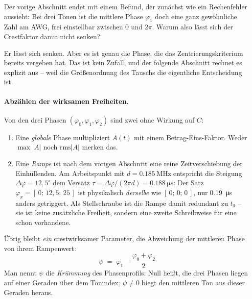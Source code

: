 \documentclass[11pt,a4paper]{article}
\newcommand{\crest}{\ensuremath{C}}
\begin{document}
Der vorige Abschnitt endet mit einem Befund, der zunächst wie ein
Rechenfehler aussieht: Bei drei Tönen ist die mittlere Phase $\varphi_1$ doch
eine ganz gewöhnliche Zahl am AWG, frei einstellbar zwischen $0$ und
$2\pi$. Warum also lässt sich der Crestfaktor damit nicht senken?

Er lässt sich senken. Aber es ist genau die Phase, die das
Zentrierungskriterium bereits vergeben hat. Das ist kein Zufall, und der
folgende Abschnitt rechnet es explizit aus -- weil die Größenordnung des
Tauschs die eigentliche Entscheidung ist.

\paragraph{Abzählen der wirksamen Freiheiten.}
Von den drei Phasen $(\varphi_0,\varphi_1,\varphi_2)$ sind zwei ohne Wirkung
auf $\crest$:
\begin{enumerate}
  \item Eine \emph{globale} Phase multipliziert $A(t)$ mit einem Betrag-Eins-Faktor.
        Weder $\max|A|$ noch $\mathrm{rms}|A|$ merken das.
  \item Eine \emph{Rampe} ist nach dem vorigen Abschnitt eine reine
        Zeitverschiebung der Einhüllenden. Am Arbeitspunkt mit
        $d=\SI{0.185}{\mega\hertz}$ entspricht die Steigung
        $\Delta\varphi=12{,}5^\circ$ dem Versatz
        $\tau=\Delta\varphi/(2\pi d)=\SI{0.188}{\micro\second}$: Der Satz
        $\varphi_x=[\,0;\,12{,}5;\,25\,]$ ist physikalisch \emph{derselbe}
        wie $[\,0;\,0;\,0\,]$, nur \SI{0.19}{\micro\second} anders
        getriggert. Als Stellschraube ist die Rampe damit redundant zu
        $t_0$ -- sie ist keine zusätzliche Freiheit, sondern eine zweite
        Schreibweise für eine schon vorhandene.
\end{enumerate}
Übrig bleibt \emph{ein} crestwirksamer Parameter, die Abweichung der
mittleren Phase von ihrem Rampenwert:
\begin{equation}
  \boxed{\;\psi \;=\; \varphi_1 - \frac{\varphi_0+\varphi_2}{2}\;}
  \label{eq:psidef}
\end{equation}
Man nennt $\psi$ die \emph{Krümmung} des Phasenprofils: Null heißt, die drei
Phasen liegen auf einer Geraden über dem Tonindex; $\psi\neq0$ biegt den
mittleren Ton aus dieser Geraden heraus.
\end{document}
